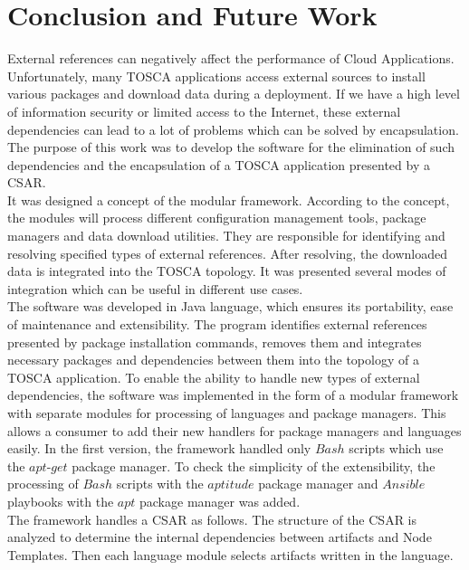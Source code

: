 
\chapter{Conclusion and Future Work}\label{chap:zusfas}
External references can negatively affect the performance of Cloud Applications.
Unfortunately, many TOSCA applications access external sources to install various packages and download data during a deployment.
If we have a high level of information security or limited access to the Internet, these external dependencies can lead to a lot of problems which can be solved by encapsulation.
The purpose of this work was to develop the software for the elimination of such dependencies and the encapsulation of a TOSCA application presented by a CSAR.\\
It was designed a concept of the modular framework. 
According to the concept, the modules will process different configuration management tools, package managers and data download utilities. 
They are responsible for identifying and resolving specified types of external references. 
After resolving, the downloaded data is integrated into the TOSCA topology.
It was presented several modes of integration which can be useful in different use cases.\\
The software was developed in Java language, which ensures its portability, ease of maintenance and extensibility.
The program identifies external references presented by package installation commands, removes them and integrates necessary packages and dependencies between them into the topology of a TOSCA application.
To enable the ability to handle new types of external dependencies, the software was implemented in the form of a modular framework with separate modules for processing of languages and package managers.
This allows a consumer to add their new handlers for package managers and languages easily.
In the first version, the framework handled only $Bash$ scripts  which use the $apt$-$get$ package manager.
To check the simplicity of the extensibility, the processing of $Bash$ scripts with the $aptitude$ package manager and  $Ansible$ playbooks with the $apt$ package manager was added.\\
The framework handles a CSAR as follows.
The structure of the CSAR is analyzed to determine the internal dependencies between artifacts and Node Templates.
Then each language module selects artifacts written in the language.
